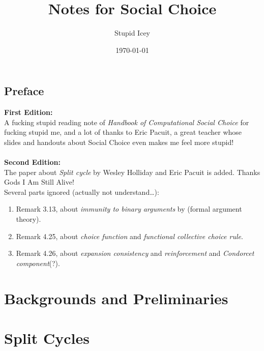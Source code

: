 \documentclass[a4paper,12pt,oneside]{book}
\title{Notes for Social Choice}
\author{Stupid Icey}
\date{\today}
\begin{document}
\maketitle


\chapter*{Preface}

\textbf{First Edition:}\\
A fucking stupid reading note of \textit{Handbook of Computational Social Choice} \parencite{Moulin2016} for fucking stupid me, and a lot of thanks to Eric Pacuit, a great teacher whose slides and handouts about Social Choice even makes me feel more stupid!\\
~\\
\noindent \textbf{Second Edition:}\\
The paper about \emph{Split cycle} by Wesley Holliday and Eric Pacuit \parencite{Holliday2020} is added. Thanks Gods I Am Still Alive!\\
Several parts ignored (actually not understand\dots):
\begin{enumerate}
  \item Remark 3.13, about \emph{immunity to binary arguments} by \textcite{Heitzig2002} (formal argument theory).
  \item Remark 4.25, about \emph{choice function} and \emph{functional collective choice rule}.
  \item Remark 4.26, about \emph{expansion consistency} and \emph{reinforcement} and \emph{Condorcet component}(?).
\end{enumerate}


\tableofcontents

\part{Backgrounds and Preliminaries}







\part{Split Cycles}





\printbibliography
\end{document}
